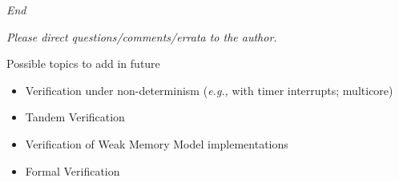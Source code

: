 \documentclass{article}
\newcommand{\eg}{\emph{e.g.,}}
\begin{document}
\begin{center}\Huge
  \vspace*{2in}

  \emph{End}

  \vspace*{2in}
  
  \begin{minipage}{7in}\Large
    \begin{center}
      \emph{Please direct questions/comments/errata to the author.}
    \end{center}
  \end{minipage}

\end{center}

\clearpage


\begin{center}
  {\Huge
    Possible topics to add in future}

  \vspace*{1in}

  \begin{minipage}{9in}\LARGE
    \begin{itemize}
    \item Verification under non-determinism ({\eg} with timer interrupts; multicore)
    \item Tandem Verification
    \item Verification of Weak Memory Model implementations
    \item Formal Verification
    \end{itemize}
  \end{minipage}

\end{center}

\clearpage

\end{document}
